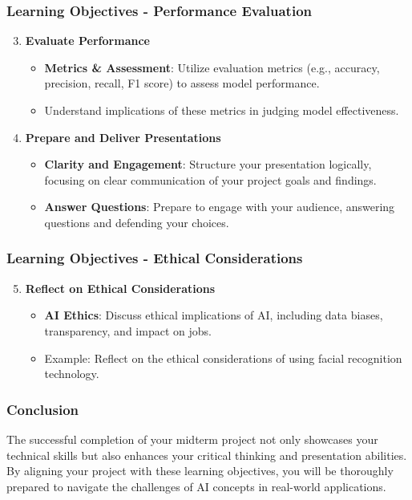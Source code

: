 \documentclass{beamer}
\begin{document}
\begin{frame}[fragile]
    \frametitle{Learning Objectives - Performance Evaluation}
    \begin{enumerate}
        \setcounter{enumi}{2} %
        \item \textbf{Evaluate Performance}
        \begin{itemize}
            \item \textbf{Metrics \& Assessment}: Utilize evaluation metrics (e.g., accuracy, precision, recall, F1 score) to assess model performance.
            \item Understand implications of these metrics in judging model effectiveness.
        \end{itemize}
        \item \textbf{Prepare and Deliver Presentations}
        \begin{itemize}
            \item \textbf{Clarity and Engagement}: Structure your presentation logically, focusing on clear communication of your project goals and findings.
            \item \textbf{Answer Questions}: Prepare to engage with your audience, answering questions and defending your choices.
        \end{itemize}
    \end{enumerate}
\end{frame}

\begin{frame}[fragile]
    \frametitle{Learning Objectives - Ethical Considerations}
    \begin{enumerate}
        \setcounter{enumi}{4} %
        \item \textbf{Reflect on Ethical Considerations}
        \begin{itemize}
            \item \textbf{AI Ethics}: Discuss ethical implications of AI, including data biases, transparency, and impact on jobs.
            \item Example: Reflect on the ethical considerations of using facial recognition technology.
        \end{itemize}
    \end{enumerate}
\end{frame}

\begin{frame}[fragile]
    \frametitle{Conclusion}
    The successful completion of your midterm project not only showcases your technical skills but also enhances your critical thinking and presentation abilities. 
    By aligning your project with these learning objectives, you will be thoroughly prepared to navigate the challenges of AI concepts in real-world applications.
\end{frame}
\end{document}
